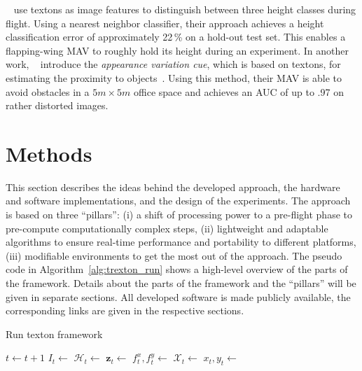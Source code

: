 \documentclass{report}
\begin{document}
\citeauthor{de2009design}~\cite{de2009design} use textons as image
features to distinguish between three height classes during
flight. Using a nearest neighbor classifier, their approach achieves a
height classification error of approximately 22\,\% on a hold-out test
set.  This enables a flapping-wing MAV to roughly hold its height
during an experiment. In another work,
\citeauthor{de2012appearance}~\cite{de2012appearance} introduce the
\emph{appearance variation cue}, which is based on textons, for
estimating the proximity to objects~\cite{de2012appearance}.
Using this method, their MAV is able to avoid obstacles in a
$5m \times 5m$ office space and achieves an AUC of up to .97 on rather
distorted images.

\chapter{Methods}
\label{chap:methods}

This section describes the ideas behind the developed approach, the
hardware and software implementations, and the design of the
experiments.
The approach is based on three ``pillars'': (i) a shift of processing
power to a pre-flight phase to pre-compute computationally complex
steps, (ii) lightweight and adaptable algorithms to ensure real-time
performance and portability to different platforms, (iii) modifiable
environments to get the most out of the approach. The pseudo code in
Algorithm~\ref{alg:trexton_run} shows a high-level overview of the
parts of the framework. Details about the parts of the framework and
the ``pillars'' will be given in separate sections. All developed
software is made publicly available, the corresponding links are given
in the respective sections.
\begin{algorithm}
    \caption{Run texton framework}
    \label{alg:trexton_run}
    \begin{algorithmic}[1]
       \State $t \gets t+1$ \State
      $I_t \gets$  \State
      $\mathcal{H}_t \gets$ 
      \State $\mathbf{z}_t \gets$
       \State $f_t^x, f_t^y \gets$
       \State $\mathcal{X}_t \gets$
       \State $x_t, y_t \gets$
       \State
      \EndProcedure
    \end{algorithmic}
  \end{algorithm}  
\end{document}
